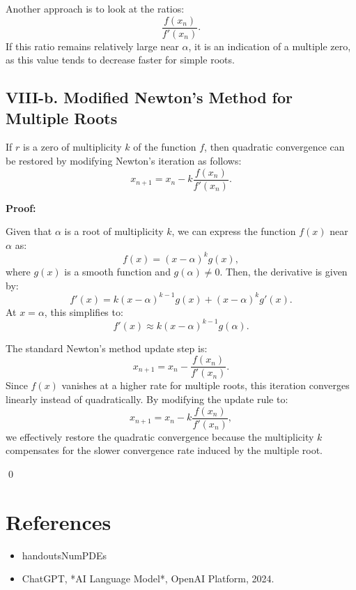 \documentclass[a4paper]{article}
\begin{document}
Another approach is to look at the ratios:
\[
\frac{f(x_n)}{f'(x_n)}.
\]
If this ratio remains relatively large near \( \alpha \), it is an indication of a multiple zero, as this value tends to decrease faster for simple roots.

\subsection*{VIII-b. Modified Newton’s Method for Multiple Roots}

If \( r \) is a zero of multiplicity \( k \) of the function \( f \), then quadratic convergence can be restored by modifying Newton’s iteration as follows:
\[
x_{n+1} = x_n - k \frac{f(x_n)}{f'(x_n)}.
\]

\textbf{Proof:}

Given that \( \alpha \) is a root of multiplicity \( k \), we can express the function \( f(x) \) near \( \alpha \) as:
\[
f(x) = (x - \alpha)^k g(x),
\]
where \( g(x) \) is a smooth function and \( g(\alpha) \neq 0 \). Then, the derivative is given by:
\[
f'(x) = k(x - \alpha)^{k-1} g(x) + (x - \alpha)^k g'(x).
\]
At \( x = \alpha \), this simplifies to:
\[
f'(x) \approx k (x - \alpha)^{k-1} g(\alpha).
\]

The standard Newton’s method update step is:
\[
x_{n+1} = x_n - \frac{f(x_n)}{f'(x_n)}.
\]
Since \( f(x) \) vanishes at a higher rate for multiple roots, this iteration converges linearly instead of quadratically. By modifying the update rule to:
\[
x_{n+1} = x_n - k \frac{f(x_n)}{f'(x_n)},
\]
we effectively restore the quadratic convergence because the multiplicity \( k \) compensates for the slower convergence rate induced by the multiple root.


\qed

\section*{References}
\begin{itemize}
   \item handoutsNumPDEs
   \item ChatGPT, *AI Language Model*, OpenAI Platform, 2024.
\end{itemize}
\end{document}
